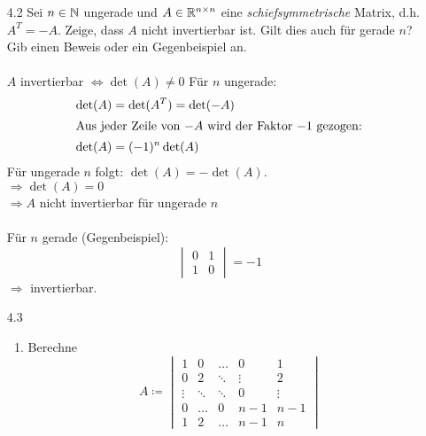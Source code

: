 \documentclass{HM}
\begin{document}
	\begin{enumerate}
	\item[4.2] Sei $n\in\mathbb{N}$ ungerade und $A\in\mathbb{R}^{n\times n}$ eine \textit{schiefsymmetrische} Matrix, d.h. $A^T=-A$. Zeige, dass $A$ nicht invertierbar ist. Gilt dies auch für gerade $n$? Gib einen Beweis oder ein Gegenbeispiel an.\\\\
		$A$ invertierbar $\Leftrightarrow \det(A)\not=0$
		Für $n$ ungerade:\\
		\begin{align*}
			\det(A)&=\det(A^T)=\det(-A)\\
			\intertext{Aus jeder Zeile von $-A$ wird der Faktor $-1$ gezogen:}
			\det(A)&=(-1)^n\det(A)
		\end{align*}
		Für ungerade $n$ folgt: $\det(A)=-\det(A)$.\\
		$\Rightarrow \det(A)=0$\\
		$\Rightarrow A$ nicht invertierbar für ungerade $n$\\\\
		Für $n$ gerade (Gegenbeispiel):
		$$\begin{vmatrix}
			0&1\\
			1&0
		\end{vmatrix} = -1$$
		$\Rightarrow$ invertierbar.
	
	\newpage
	\item[4.3]
		\begin{enumerate}
			\item Berechne\\
			$$A\coloneqq\begin{vmatrix}
				1&0&\hdots&0&1\\
				0&2&\ddots&\vdots&2\\
				\vdots&\ddots&\ddots&0&\vdots\\
				0&\hdots&0&n-1&n-1\\
				1&2&\hdots&n-1&n
			\end{vmatrix}$$
			

\end{enumerate}
\end{enumerate}
\end{document}
